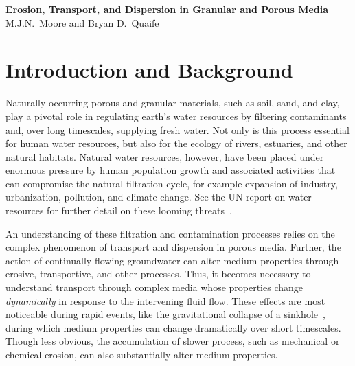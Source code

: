 \documentclass[11pt]{article}
\begin{document}
\begin{center}
{\large \bf Erosion, Transport, and Dispersion in Granular
and Porous Media} 
\\
M.J.N.~Moore and Bryan D.~Quaife
\end{center}


\section{Introduction and Background}
Naturally occurring porous and granular materials, such as soil, sand, and clay, play a pivotal role in regulating earth's water resources by filtering contaminants and, over long timescales, supplying fresh water.  Not only is this process essential for human water resources, but also for the ecology of rivers, estuaries, and other natural habitats.  Natural water resources, however, have been placed under enormous pressure by human population growth and associated activities that can compromise the natural filtration cycle, for example expansion of industry, urbanization, pollution, and climate change. See the UN report on water resources for further detail on these looming threats~\cite{UNwater}.

An understanding of these filtration and contamination processes relies on the complex phenomenon of transport and dispersion in porous media. Further, the action of continually flowing groundwater can alter medium properties through erosive, transportive, and other processes. Thus, it becomes necessary to understand transport through complex media whose properties change {\em dynamically} in response to the intervening fluid flow. These effects are most noticeable during rapid events, like the gravitational collapse of a sinkhole~\cite{sandhu2018fate}, during which medium properties can change dramatically over short timescales. Though less obvious, the accumulation of slower process, such as mechanical or chemical erosion, can also substantially alter medium properties.  
\end{document}
